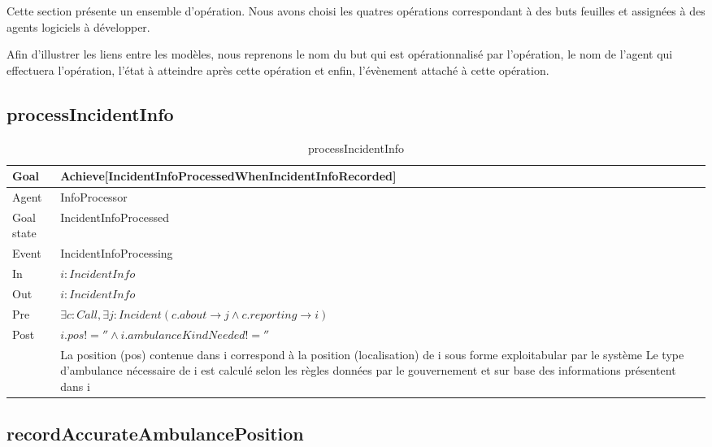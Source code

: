 Cette section présente un ensemble d'opération. Nous avons choisi les quatres
opérations correspondant à des buts feuilles et assignées à des agents logiciels
à développer.

Afin d'illustrer les liens entre les modèles, nous reprenons le nom du but
qui est opérationnalisé par l'opération, le nom de l'agent qui effectuera 
l'opération, l'état à atteindre après cette opération et enfin, l'évènement
attaché à cette opération.

\subsection{processIncidentInfo}
	
	
	\begin{table}[!h] \centering
		\begin{tabularx}{\textwidth}{|l|X|} \hline
			Goal & Achieve[IncidentInfoProcessedWhenIncidentInfoRecorded] \\ \hline
			Agent & InfoProcessor \\ \hline
			Goal state & IncidentInfoProcessed \\ \hline
			Event & IncidentInfoProcessing \\ \hline
			In & $i: IncidentInfo$ \\ \hline
			Out & $i: IncidentInfo$ \\ \hline
			Pre & $\exists c: Call, \exists j: Incident (c.about \rightarrow j \wedge c.reporting \rightarrow i)$ \\ \hline
			Post & $i.pos != '' \wedge i.ambulanceKindNeeded != ''$  \\
				 & La position (pos) contenue dans i correspond à la position (localisation) de i sous forme exploitabular par le système 
				  Le type d'ambulance nécessaire de i est calculé selon les règles données par le gouvernement et sur base des 
				  informations présentent dans i \\ \hline
		\end{tabularx}
		\caption{processIncidentInfo}
	\end{table}

\subsection{recordAccurateAmbulancePosition}
	
	
